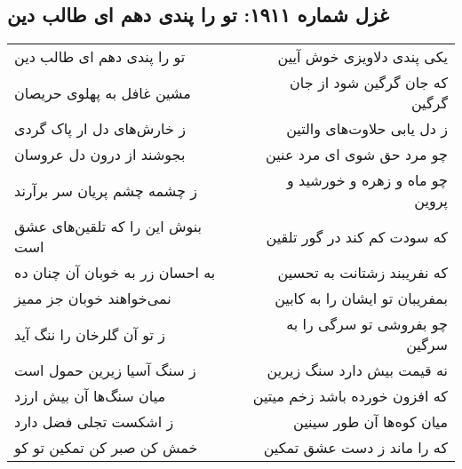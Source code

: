 \begin{center}
\section*{غزل شماره ۱۹۱۱: تو را پندی دهم ای طالب دین}
\label{sec:1911}
\begin{longtable}{l p{0.5cm} r}
تو را پندی دهم ای طالب دین
&&
یکی پندی دلاویزی خوش آیین
\\
مشین غافل به پهلوی حریصان
&&
که جان گرگین شود از جان گرگین
\\
ز خارش‌های دل ار پاک گردی
&&
ز دل یابی حلاوت‌های والتین
\\
بجوشند از درون دل عروسان
&&
چو مرد حق شوی ای مرد عنین
\\
ز چشمه چشم پریان سر برآرند
&&
چو ماه و زهره و خورشید و پروین
\\
بنوش این را که تلقین‌های عشق است
&&
که سودت کم کند در گور تلقین
\\
به احسان زر به خوبان آن چنان ده
&&
که نفریبند زشتانت به تحسین
\\
نمی‌خواهند خوبان جز ممیز
&&
بمفریبان تو ایشان را به کابین
\\
ز تو آن گلرخان را ننگ آید
&&
چو بفروشی تو سرگی را به سرگین
\\
ز سنگ آسیا زیرین حمول است
&&
نه قیمت بیش دارد سنگ زیرین
\\
میان سنگ‌ها آن بیش ارزد
&&
که افزون خورده باشد زخم میتین
\\
ز اشکست تجلی فضل دارد
&&
میان کوه‌ها آن طور سینین
\\
خمش کن صبر کن تمکین تو کو
&&
که را ماند ز دست عشق تمکین
\\
\end{longtable}
\end{center}
